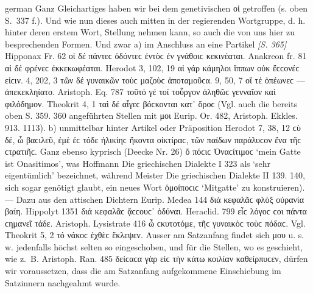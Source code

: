 \begin{otherlanguage*}{german}
Ganz Gleichartiges haben wir bei dem genetivischen οἱ getroffen (s. oben S.~337 f.). Und wie nun dieses auch mitten in der regierenden Wortgruppe, d. h. hinter deren erstem Wort, Stellung nehmen kann, so auch die von uns hier zu besprechenden Formen. Und zwar a) im Anschluss an eine Partikel \hypertarget{p365}{\emph{[S. 365]}}\label{p365} Hipponax Fr. 62 οἱ δέ  πάντεϲ ὀδόντεϲ ἐντὸϲ ἐν γνάθοιϲ κεκινέαται. Anakreon fr. 81 αἱ δέ  φρένεϲ ἐκκεκωφέαται. Herodot 3, 102, 19 αἱ γάρ  κάμηλοι ἵππων οὐκ ἔϲϲονέϲ εἰϲιν. 4, 202, 3 τῶν δέ  γυναικῶν τοὺϲ μαζοὺϲ ἀποταμοῦϲα. 9, 50, 7 οἵ τέ  ὀπέωνεϲ — ἀπεκεκληίατο. Aristoph. Eq. 787 τοῦτό γέ τοί  τοὖργον ἀληθῶϲ γενναῖον καὶ φιλόδημον. Theokrit 4, 1 ταὶ δέ  αἶγεϲ βόϲκονται κατ᾽ ὄροϲ (Vgl. auch die bereits oben S. 359. 360 angeführten Stellen mit μοι Eurip. Or. 482, Aristoph. Ekkles. 913. 1113). b) unmittelbar hinter Artikel oder Präposition Herodot 7, 38, 12 ϲὺ δέ, ὦ βαϲιλεῦ, ἐμὲ ἐϲ τόδε ἡλικίηϲ ἥκοντα οἰκτίραϲ, τῶν  παίδων παράλυϲον ἕνα τῆϲ ϲτρατιῆϲ. Ganz ebenso kyprisch (Deecke Nr. 26) ὄ  πόϲιϲ Ὀναϲίτιμοϲ ‘mein Gatte ist Onasitimos’, was Hoffmann Die griechischen Dialekte I 323 als ‘sehr eigentümlich’ bezeichnet, während Meister Die griechischen Dialekte II 139. 140, sich sogar genötigt glaubt, ein neues Wort ὁμοίποϲιϲ ‘Mitgatte’ zu konstruieren). — Dazu aus den attischen Dichtern Eurip. Medea 144 διά  κεφαλᾶϲ φλὸξ οὐρανία βαίη. Hippolyt 1351 διά  κεφαλᾶϲ ᾄϲϲουϲ᾽ ὀδύναι. Heraclid. 799 εἷϲ  λόγοϲ ϲοι πάντα ϲημανεῖ τάδε. Aristoph. Lysistrate 416 ὦ ϲκυτοτόμε, τῆϲ  γυναικὸϲ τοὺϲ πόδαϲ. Vgl. Theokrit 5, 2 τό  νάκοϲ ἐχθὲϲ ἔκλεψεν. Ausser am Satzanfang findet sich μου u. s. w. jedenfalls höchst selten so eingeschoben, und für die Stellen, wo es geschieht, wie z.~B. Aristoph. Ran. 485 δείϲαϲα γὰρ εἰϲ τὴν κάτω  κοιλίαν καθείρπυϲεν, dürfen wir voraussetzen, dass die am Satzanfang aufgekommene Einschiebung im Satzinnern nachgeahmt wurde.


\end{otherlanguage*}

